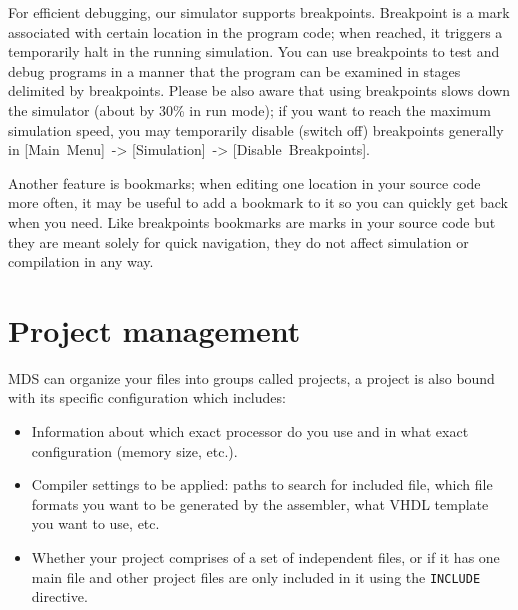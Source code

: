         For efficient debugging, our simulator supports breakpoints. Breakpoint is a mark associated with certain location in the program code; when reached, it triggers a temporarily halt in the running simulation. You can use breakpoints to test and debug programs in a manner that the program can be examined in stages delimited by breakpoints. Please be also aware that using breakpoints slows down the simulator (about by 30\% in run mode); if you want to reach the maximum simulation speed, you may temporarily disable (switch off) breakpoints generally in [Main~Menu]~-> [Simulation]~-> [Disable~Breakpoints].

        Another feature is bookmarks; when editing one location in your source code more often, it may be useful to add a bookmark to it so you can quickly get back when you need. Like breakpoints bookmarks are marks in your source code but they are meant solely for quick navigation, they do not affect simulation or compilation in any way.

\section{Project management}
    MDS can organize your files into groups called projects, a project is also bound with its specific configuration which includes:
    \begin{itemize}
        \item Information about which exact processor do you use and in what exact configuration (memory size, etc.).
        \item Compiler settings to be applied: paths to search for included file, which file formats you want to be generated by the assembler, what VHDL template you want to use, etc.
        \item Whether your project comprises of a set of independent files, or if it has one main file and other project files are only included in it using the \texttt{INCLUDE} directive.
    \end{itemize}


